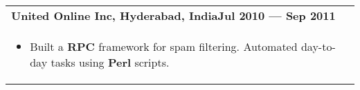 \documentclass{article}
\begin{document}
\begin{tabular}{p{\dimexpr\linewidth-2\tabcolsep}}
    \bigskip
    {\bfseries United Online Inc, Hyderabad, India\hfill Jul 2010 --- Sep 2011} \\
    \begin{itemize}
      \item Built a \textbf{RPC} framework for spam filtering.  Automated day-to-day tasks using \textbf{Perl} scripts.
    \end{itemize}

\end{tabular}
\end{document}
